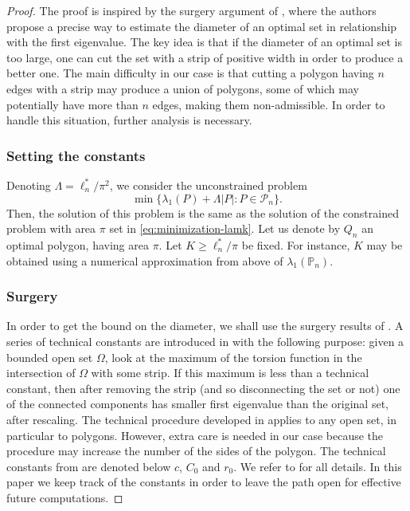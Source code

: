 \documentclass[JEP,XML,SOM,Unicode,ThmDefs,NoFloatCountersInSection,published]{cedram}
\theoremstyle{plain}
\theoremstyle{definition}
\let\Bbb\mathbb
\newcommand{\Om}{\Omega}
\newcommand{\lb}{\lambda}
\begin{document}
\begin{proof}
The proof is inspired by the surgery argument of \cite{BuMa15}, where the authors propose a precise way to estimate the diameter of an optimal set in relationship with the first eigenvalue. The key idea is that if the diameter of an optimal set is too large, one can cut the set with a strip of positive width in order to produce a better one. The main difficulty in our case is that cutting a polygon having $n$ edges with a strip may produce a union of polygons, some of which may potentially have more than $n$ edges, making them non-admissible. In order to handle this situation, further analysis is necessary.

\subsubsection*{Setting the constants}
Denoting $\Lambda= \ell_n^*/\pi^2 $, we consider
the unconstrained problem
\begin{equation}\label{bobu203}
\min \{ \lb_1(P) + \Lambda |P|: P \in {\mathcal P_n}\}.
\end{equation}
Then, the solution of this problem is the same as the solution of the constrained problem with area $\pi$ set in \eqref{eq:minimization-lamk}. Let us denote by $Q_n$ an optimal polygon, having area $\pi$. Let $K \ge \ell_n^*/\pi$ be fixed. For instance, $K$ may be obtained using a numerical approximation from above of $\lb_1(\Bbb P_n)$.

\subsubsection*{Surgery}
In order to get the bound on the diameter, we shall use the surgery results of \cite{BuMa15}. A series of technical constants are introduced in \cite{BuMa15} with the following purpose: given a bounded open set $\Om$, look at the maximum of the torsion function in the intersection of $\Om$ with some strip. If this maximum is less than a technical constant, then after removing the strip (and so disconnecting the set or not) one of the connected components has smaller first eigenvalue than the original set, after rescaling. The technical procedure developed in \cite{BuMa15} applies to any open set, in particular to polygons. However, extra care is needed in our case because the procedure may increase the number of the sides of the polygon. The technical constants from
\cite{BuMa15} are denoted below $c$, $C_0$ and $r_0$. We refer to \cite{BuMa15} for all details. In this paper we keep track of the constants in order to leave the path open for effective future computations.


\end{proof}
\end{document}

